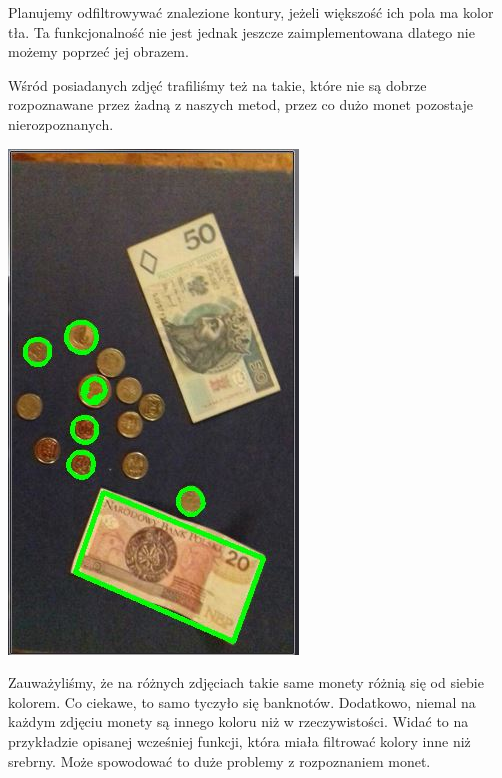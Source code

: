 \documentclass[12pt]{article}
\begin{document}
Planujemy odfiltrowywać znalezione kontury, jeżeli większość ich pola ma kolor tła. Ta funkcjonalność nie jest jednak jeszcze zaimplementowana dlatego nie możemy poprzeć jej obrazem.

Wśród posiadanych zdjęć trafiliśmy też na takie, które nie są dobrze rozpoznawane przez żadną z naszych metod, przez co dużo monet pozostaje nierozpoznanych.

\includegraphics[scale=0.8]{slabe}

Zauważyliśmy, że na różnych zdjęciach takie same monety różnią się od siebie kolorem. Co ciekawe, to samo tyczyło się banknotów. Dodatkowo, niemal na każdym zdjęciu monety są innego koloru niż w rzeczywistości. Widać to na przykładzie opisanej wcześniej funkcji, która miała filtrować kolory inne niż srebrny. Może spowodować to duże problemy z rozpoznaniem monet.
\end{document}
